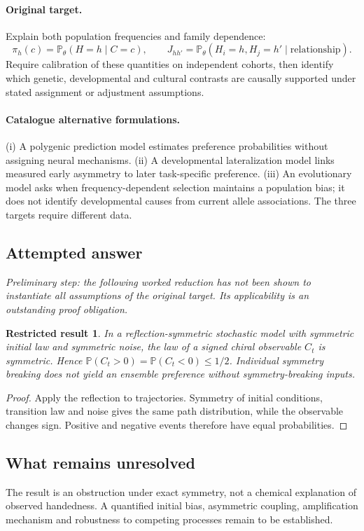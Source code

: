 \documentclass[11pt]{article}
\newcommand{\Prob}{\mathbb P}
\providecommand{\Prob}{\mathbb P}
\newtheorem{attemptresult}{Restricted result}[section]
\begin{document}
\paragraph{Original target.}
Explain both population frequencies and family dependence:
    \[\pi_h(c)=\Prob_\theta(H=h\mid C=c),\qquad
       J_{hh'}=\Prob_\theta(H_i=h,H_j=h'\mid\text{relationship}).\]
    Require calibration of these quantities on independent cohorts, then identify which genetic, developmental and cultural contrasts are causally supported under stated assignment or adjustment assumptions.
\paragraph{Catalogue alternative formulations.}
(i) A polygenic prediction model estimates preference probabilities without assigning neural mechanisms. (ii) A developmental lateralization model links measured early asymmetry to later task-specific preference. (iii) An evolutionary model asks when frequency-dependent selection maintains a population bias; it does not identify developmental causes from current allele associations. The three targets require different data.
\subsection{Attempted answer}
\noindent\emph{Preliminary step: the following worked reduction has not been shown to instantiate all assumptions of the original target. Its applicability is an outstanding proof obligation.}

\begin{attemptresult}
In a reflection-symmetric stochastic model with symmetric initial law and symmetric noise, the law of a signed chiral observable $C_t$ is symmetric. Hence $\Prob(C_t>0)=\Prob(C_t<0)\leq1/2$. Individual symmetry breaking does not yield an ensemble preference without symmetry-breaking inputs.
\end{attemptresult}
\begin{proof}
Apply the reflection to trajectories. Symmetry of initial conditions, transition law and noise gives the same path distribution, while the observable changes sign. Positive and negative events therefore have equal probabilities.
\end{proof}
\subsection{What remains unresolved}
The result is an obstruction under exact symmetry, not a chemical explanation of observed handedness. A quantified initial bias, asymmetric coupling, amplification mechanism and robustness to competing processes remain to be established.
\end{document}
